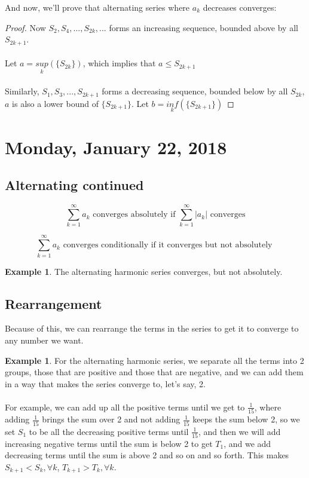 \documentclass[12pt]{article}
\theoremstyle{plain}
\theoremstyle{definition}
\newtheorem{example}[theorem]{Example}
\begin{document}
And now, we'll prove that alternating series where $a_k$ decreases converges:

\begin{proof}
	Now $S_2, S_4, ... , S_{2k},...$ forms an increasing sequence, bounded above by all $S_{2k+1}$.\\
	\\
	Let $a = \underset{k}{sup}(\{ S_{2k} \})$, which implies that $a \leq S_{2k+1}$\\
	\\
	Similarly, $S_1, S_3, ... , S_{2k+1}$ forms a decreasing sequence, bounded below by all $S_{2k}$, $a$ is also a lower bound of $\{ S_{2k+1} \}$. Let $b= \underset{k}{inf} (\{ S_{2k+1} \})$
\end{proof}

\newpage

\section{Monday, January 22, 2018}

\subsection{Alternating continued}

$$\sum^\infty_{k=1} a_k \text{ converges absolutely if } \sum^\infty_{k=1} |a_k| \text{ converges}$$

$$\sum^\infty_{k=1} a_k \text{ converges conditionally if it converges but not absolutely }$$

\begin{example}
The alternating harmonic series converges, but not absolutely.
\end{example}

\subsection{Rearrangement}

Because of this, we can rearrange the terms in the series to get it to converge to any number we want.

\begin{example}
	For the alternating harmonic series, we separate all the terms into 2 groups, those that are positive and those that are negative, and we can add them in a way that makes the series converge to, let's say, 2.
	\\
	\\
	For example, we can add up all the positive terms until we get to $\frac{1}{15}$, where adding $\frac{1}{15}$ brings the sum over 2 and not adding $\frac{1}{15}$ keeps the sum below 2, so we set
	$S_1$ to be all the decreasing positive terms until $\frac{1}{15}$, and then we will add increasing negative terms until the sum is below 2 to get $T_1$, and we add decreasing terms until the sum is above 2 and so on and so forth. This makes $S_{k+1} < S_k, \forall k$, $T_{k+1} > T_k, \forall k$.
	
\end{example}
\end{document}
